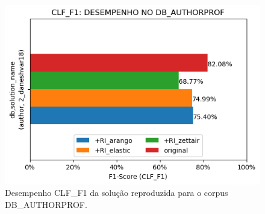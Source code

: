 \begin{figure}[h]
    \centering
    \caption{Desempenho CLF\_F1 da solução reproduzida para o corpus DB\_AUTHORPROF.}
    \vspace{-0.5cm}
    \begin{center}
        \includegraphics[scale=0.75]{img/clf-f1-bars-authorprof.png}
    \end{center}
    \vspace{-0.5cm}
    \label{fig:clf-f1-bars-authorprof}
\end{figure}